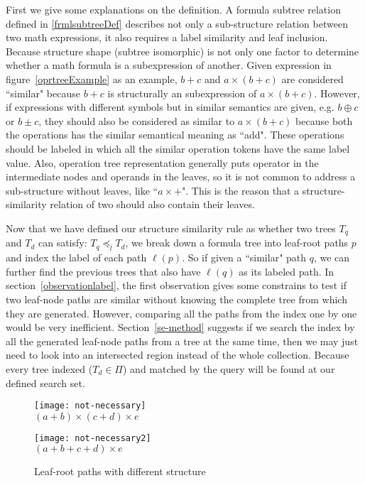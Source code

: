 First we give some explanations on the definition.
A formula subtree relation defined in \ref{frmlsubtreeDef} describes not only a sub-structure relation between two math expressions, it also requires a label similarity and leaf inclusion.
Because structure shape (subtree isomorphic) is not only one factor to determine whether a math formula is a subexpression of another. 
Given expression in figure~\ref{oprtreeExample} as an example, $b+c$ and $a \times (b+c)$ are considered ``similar" because $b+c$ is structurally an subexpression of $a \times (b+c)$.
However, if expressions with different symbols but in similar semantics are given, e.g. $b \oplus c$ or $b \pm c$, 
they should also be considered as similar to $a \times (b+c)$ because both the operations has the similar semantical meaning as ``add". 
These operations should be labeled in which all the similar operation tokens have the same label value. 
Also, operation tree representation generally puts operator in the intermediate nodes and operands in the leaves, so it is not common to address a sub-structure without leaves, like ``$a \times + $". 
This is the reason that a structure-similarity relation of two should also contain their leaves.

Now that we have defined our structure similarity rule as whether two trees $T_q$ and $T_d$ can satisfy: $T_q \preceq_l T_d$,
we break down a formula tree into leaf-root paths $p$ and index the label of each path $\ell(p)$. So if given a ``similar" path $q$, we can further find the previous trees that also have $\ell(q)$ as its labeled path.
In section~\ref{observationlabel}, the first observation gives some constrains to test if two leaf-node paths are similar without knowing the complete tree from which they are generated.
However, comparing all the paths from the index one by one would be very inefficient. Section~\ref{se-method} suggests if we search the index by all the generated leaf-node paths from a tree at the same time, then we may just need to look into an intersected region instead of the whole collection.
Because every tree indexed ($T_d \in \Pi$) and matched by the query will be found at our defined search set.

\begin{figure}
\begin{minipage}[b]{2.65in}
\begin{center}
\texttt{[image: not-necessary]}
\\ $(a+b) \times (c+d) \times e$
\end{center}
\end{minipage}
\hspace*{.38in}
\begin{minipage}[b]{2.65in}
\begin{center}
{\texttt{[image: not-necessary2]}}
\\ $(a+b+c+d) \times e$
\end{center}
\end{minipage}
\caption{Leaf-root paths with different structure}\label{notnecessary}
\end{figure}

